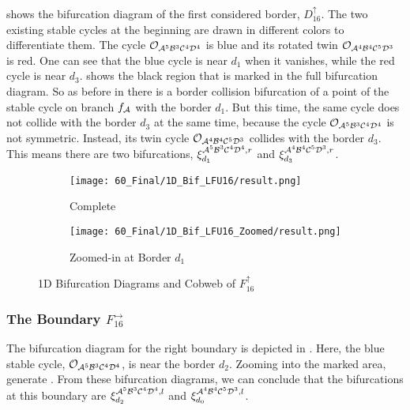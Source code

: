  shows the bifurcation diagram of the first considered border, $D_{16}^\uparrow$.
The two existing stable cycles at the beginning are drawn in different colors to differentiate them.
The cycle $\mathcal{O}_{\mathcal{A}^5\mathcal{B}^3\mathcal{C}^4\mathcal{D}^4}$ is blue and its rotated twin $\mathcal{O}_{\mathcal{A}^4\mathcal{B}^4\mathcal{C}^5\mathcal{D}^3}$ is red.
One can see that the blue cycle is near $d_1$ when it vanishes, while the red cycle is near $d_3$.
 shows the black region that is marked in the full bifurcation diagram.
So as before in  there is a border collision bifurcation of a point of the stable cycle on branch $f_{\mathcal{A}}$ with the border $d_1$.
But this time, the same cycle does not collide with the border $d_3$ at the same time, because the cycle $\mathcal{O}_{\mathcal{A}^5\mathcal{B}^3\mathcal{C}^4\mathcal{D}^4}$ is not symmetric.
Instead, its twin cycle $\mathcal{O}_{\mathcal{A}^4\mathcal{B}^4\mathcal{C}^5\mathcal{D}^3}$ collides with the border $d_3$.
This means there are two bifurcations, $\xi_{d_1}^{\mathcal{A}^5\mathcal{B}^3\mathcal{C}^4\mathcal{D}^4, r}$ and $\xi_{d_3}^{\mathcal{A}^4\mathcal{B}^4\mathcal{C}^5\mathcal{D}^3, r}$.

\begin{figure}
    \centering
    \begin{subfigure}{0.4\textwidth}
        \centering
        \texttt{[image: 60\_Final/1D\_Bif\_LFU16/result.png]}
        \caption{Complete}
        \label{fig:final.bifurcation.F.up}
    \end{subfigure}
    \begin{subfigure}{0.4\textwidth}
        \centering
        \texttt{[image: 60\_Final/1D\_Bif\_LFU16\_Zoomed/result.png]}
        \caption{Zoomed-in at Border $d_1$}
        \label{fig:final.bifurcation.F.up.zoomed}
    \end{subfigure}
    \caption{1D Bifurcation Diagrams and Cobweb of $F_{16}^\uparrow$}
\end{figure}

\subsubsection{The Boundary $F_{16}^\rightarrow$}

The bifurcation diagram for the right boundary is depicted in .
Here, the blue stable cycle, $\mathcal{O}_{\mathcal{A}^5\mathcal{B}^3\mathcal{C}^4\mathcal{D}^4}$, is near the border $d_2$.
Zooming into the marked area, generate .
From these bifurcation diagrams, we can conclude that the bifurcations at this boundary are $\xi_{d_2}^{\mathcal{A}^5\mathcal{B}^3\mathcal{C}^4\mathcal{D}^4, l}$ and $\xi_{d_0}^{\mathcal{A}^4\mathcal{B}^4\mathcal{C}^5\mathcal{D}^3, l}$.

